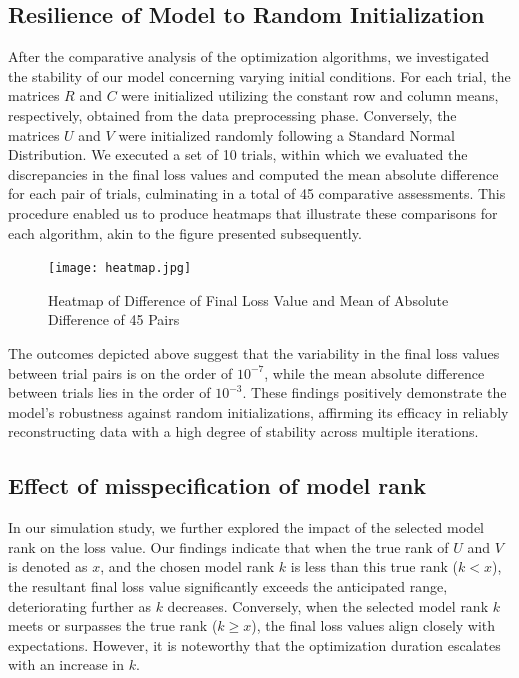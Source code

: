 \documentclass{article}
\begin{document}
\subsection{Resilience of Model to Random Initialization}
After the comparative analysis of the optimization algorithms, we investigated the stability of our model concerning varying initial conditions. For each trial, the matrices $R$ and $C$ were initialized utilizing the constant row and column means, respectively, obtained from the data preprocessing phase. Conversely, the matrices $U$ and $V$ were initialized randomly following a Standard Normal Distribution. We executed a set of 10 trials, within which we evaluated the discrepancies in the final loss values and computed the mean absolute difference for each pair of trials, culminating in a total of 45 comparative assessments. This procedure enabled us to produce heatmaps that illustrate these comparisons for each algorithm, akin to the figure presented subsequently.

\begin{figure}[h]
    \centering
    \texttt{[image: heatmap.jpg]}
    \caption{Heatmap of Difference of Final Loss Value and Mean of Absolute Difference of 45 Pairs}
    \label{Heatmap}
\end{figure}
\FloatBarrier

The outcomes depicted above suggest that the variability in the final loss values between trial pairs is on the order of $10^{-7}$, while the mean absolute difference between trials lies in the order of $10^{-3}$. These findings positively demonstrate the model's robustness against random initializations, affirming its efficacy in reliably reconstructing data with a high degree of stability across multiple iterations.

\subsection{Effect of misspecification of model rank}
In our simulation study, we further explored the impact of the selected model rank on the loss value. Our findings indicate that when the true rank of $U$ and $V$ is denoted as $x$, and the chosen model rank $k$ is less than this true rank ($k < x$), the resultant final loss value significantly exceeds the anticipated range, deteriorating further as $k$ decreases. Conversely, when the selected model rank $k$ meets or surpasses the true rank ($k \geq x$), the final loss values align closely with expectations. However, it is noteworthy that the optimization duration escalates with an increase in $k$.
\end{document}
